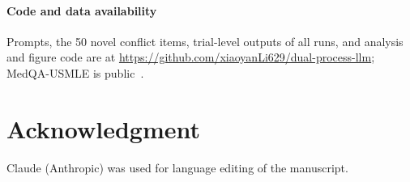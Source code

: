 \documentclass[conference]{IEEEtran}
\begin{document}
\paragraph*{Code and data availability}
Prompts, the 50 novel conflict items, trial-level outputs of all runs, and analysis and figure code are at \url{https://github.com/xiaoyanLi629/dual-process-llm}; MedQA-USMLE is public~\cite{Jin2021}.

\section*{Acknowledgment}
Claude (Anthropic) was used for language editing of the manuscript.


\let\oldthebibliography\thebibliography
\renewcommand{\thebibliography}[1]{%
  \oldthebibliography{#1}%
  \setlength{\itemsep}{0pt}%
  \setlength{\parsep}{0pt}}

\end{document}
